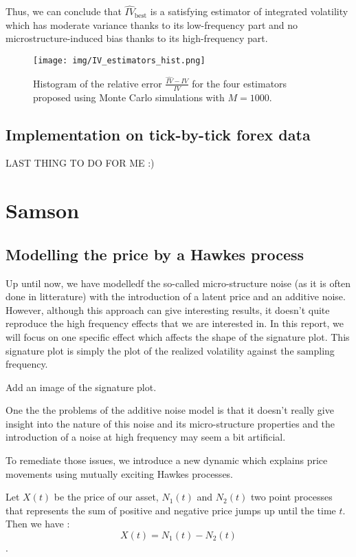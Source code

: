 \documentclass[a4paper,12pt,twoside]{article}
\begin{document}
Thus, we can conclude that $\hat{IV}_\text{best}$ is a satisfying estimator of integrated volatility which has moderate variance thanks to its low-frequency part and no microstructure-induced bias thanks to its high-frequency part.

\begin{figure}[h]
    \centering
    \texttt{[image: img/IV\_estimators\_hist.png]}
    \caption{Histogram of the relative error $\frac{\hat{IV}-IV}{IV}$ for the four estimators proposed using Monte Carlo simulations with $M=1000$.}
    \label{fig-hists}
\end{figure}

\subsection{Implementation on tick-by-tick forex data}

LAST THING TO DO FOR ME :)


\section{Samson} \label{section-samson}
\subsection{Modelling the price by a Hawkes process}

Up until now, we have modelledf the so-called micro-structure noise (as it is often done in litterature) with the introduction of a latent price and an additive noise. 
However, although this approach can give interesting results, it doesn't quite reproduce the high frequency effects that we are interested in. In this report, we will focus on one specific effect which affects the shape of the signature plot. This signature plot is simply the plot of the realized volatility against the sampling frequency.

Add an image of the signature plot.

One the the problems of the additive noise model is that it doesn't really give insight into the nature of this noise and its micro-structure properties and the introduction of a noise at high frequency may seem a bit artificial.

To remediate those issues, we introduce a new dynamic which explains price movements using mutually exciting Hawkes processes.

Let $X(t)$ be the price of our asset, $N_1(t)$ and $N_2(t)$ two point processes that represents the sum of positive and negative price jumps up until the time $t$. Then we have : \begin{equation} X(t) = N_1(t) - N_2(t) \end{equation}. 
\end{document}
